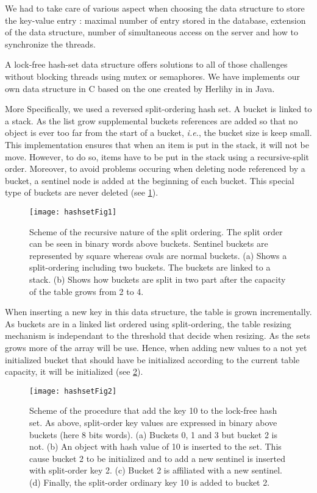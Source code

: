\documentclass[a4paper,11pt]{report}
\begin{document}
    We had to take care of various aspect when choosing the data structure to
    store the key-value entry : maximal number of entry stored in the database,
    extension of the data structure, number of simultaneous access on the server and
    how to synchronize the threads.

    A lock-free hash-set data structure offers solutions to all of those challenges without blocking threads using mutex or semaphores.
    We have implements our own data structure in C based on the one created by
    Herlihy in \cite{Herlihy2006} in Java.

    More Specifically, we used a reversed split-ordering hash set.
    A bucket is linked to a stack.
    As the list grow supplemental buckets references are added so that no object is ever too far from the start of a bucket, \textit{i.e.}, the bucket size is keep small.
    This implementation ensures that when an item is put in the stack, it will not be move.
    However, to do so, items have to be put in the stack using a recursive-split order.
    Moreover, to avoid problems occuring when deleting node referenced by a bucket, a sentinel node is added at the beginning of each bucket.
    This special type of buckets are never deleted (see \ref{fig:Fig1}).

    \begin{figure}[h]
        \centering
            \texttt{[image: hashsetFig1]}
        \caption{Scheme of the recursive nature of the split ordering.
        The split order can be seen in binary words above buckets.
        Sentinel buckets are represented by square whereas ovals are normal buckets.
        (a) Shows a split-ordering including two buckets. The buckets are linked to a stack.
        (b) Shows how buckets are split in two part after the capacity of the table grows from 2 to 4.}
        \label{fig:Fig1}
    \end{figure}

    When inserting a new key in this data structure, the table is grown incrementally.
    As buckets are in a linked list ordered using split-ordering, the table resizing mechanism is independant to the threshold that decide when resizing.
    As the sets grows more of the array will be use. Hence, when adding new values to a not yet initialized bucket that should have be initialized according to the current table capacity, it will be initialized (see \ref{fig:Fig2}).


    \begin{figure}[h]
        \centering
            \texttt{[image: hashsetFig2]}
        \caption{Scheme of the procedure that add the key 10 to the lock-free hash set.
        As above, split-order key values are expressed in binary above buckets (here 8 bits words).
        (a) Buckets 0, 1 and 3 but bucket 2 is not.
        (b) An object with hash value of 10 is inserted to the set. This cause bucket 2 to be initialized and to add a new sentinel is inserted with split-order key 2.
        (c) Bucket 2 is affiliated with a new sentinel.
        (d) Finally, the split-order ordinary key 10 is added to bucket 2.}
        \label{fig:Fig2}
    \end{figure}
\end{document}
